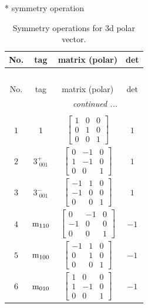\documentclass[fleqn,8pt]{jsarticle}
\begin{document}
* symmetry operation
\renewcommand{\arraystretch}{1.3}
\begin{longtable}{cccc}
\caption{Symmetry operations for 3d polar vector.}
 \\
 \hline \hline
No. & tag & matrix (polar) & det \\ \hline \endfirsthead

\multicolumn{3}{l}{\tablename\ \thetable{}} \\
 \hline \hline
No. & tag & matrix (polar) & det \\ \hline \endhead

 \hline \hline
\multicolumn{3}{r}{\footnotesize\it continued ...} \\ \endfoot

 \hline \hline
\multicolumn{3}{r}{} \\ \endlastfoot

$ 1 $ & $ 1 $ & $ \begin{bmatrix} 1 & 0 & 0 \\ 0 & 1 & 0 \\ 0 & 0 & 1 \end{bmatrix} $ & $ 1 $ \\ \hline
$ 2 $ & $ 3^{+}_{\,\,001} $ & $ \begin{bmatrix} 0 & -1 & 0 \\ 1 & -1 & 0 \\ 0 & 0 & 1 \end{bmatrix} $ & $ 1 $ \\ \hline
$ 3 $ & $ 3^{-}_{\,\,001} $ & $ \begin{bmatrix} -1 & 1 & 0 \\ -1 & 0 & 0 \\ 0 & 0 & 1 \end{bmatrix} $ & $ 1 $ \\ \hline
$ 4 $ & $ {\rm m}_{110} $ & $ \begin{bmatrix} 0 & -1 & 0 \\ -1 & 0 & 0 \\ 0 & 0 & 1 \end{bmatrix} $ & $ -1 $ \\ \hline
$ 5 $ & $ {\rm m}_{100} $ & $ \begin{bmatrix} -1 & 1 & 0 \\ 0 & 1 & 0 \\ 0 & 0 & 1 \end{bmatrix} $ & $ -1 $ \\ \hline
$ 6 $ & $ {\rm m}_{010} $ & $ \begin{bmatrix} 1 & 0 & 0 \\ 1 & -1 & 0 \\ 0 & 0 & 1 \end{bmatrix} $ & $ -1 $ \\
\end{longtable}
\end{document}
